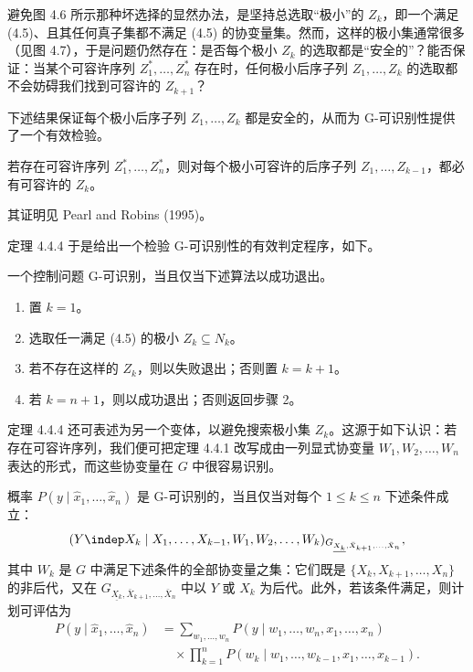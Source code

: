 避免图 4.6 所示那种坏选择的显然办法，是坚持总选取“极小”的 $Z_k$，即一个满足 \textup{(4.5)}、且其任何真子集都不满足 \textup{(4.5)} 的协变量集。然而，这样的极小集通常很多（见图 4.7），于是问题仍然存在：是否每个极小 $Z_k$ 的选取都是“安全的”？能否保证：当某个可容许序列 $Z_1^*,\dots,Z_n^*$ 存在时，任何极小后序子列 $Z_1,\dots,Z_k$ 的选取都不会妨碍我们找到可容许的 $Z_{k+1}$？

下述结果保证每个极小后序子列 $Z_1,\dots,Z_k$ 都是安全的，从而为 G-可识别性提供了一个有效检验。

\begin{theorem}
若存在可容许序列 $Z_1^*,\dots,Z_n^*$，则对每个极小可容许的后序子列 $Z_1,\dots,Z_{k-1}$，都必有可容许的 $Z_k$。
\end{theorem}

其证明见 Pearl and Robins (1995)。

定理 4.4.4 于是给出一个检验 G-可识别性的有效判定程序，如下。

\begin{corollary}
一个控制问题 G-可识别，当且仅当下述算法以成功退出。
\begin{enumerate}[label=\arabic*.,leftmargin=2.2em]
\item 置 $k=1$。
\item 选取任一满足 \textup{(4.5)} 的极小 $Z_k\subseteq N_k$。
\item 若不存在这样的 $Z_k$，则以失败退出；否则置 $k=k+1$。
\item 若 $k=n+1$，则以成功退出；否则返回步骤 2。
\end{enumerate}
\end{corollary}

定理 4.4.4 还可表述为另一个变体，以避免搜索极小集 $Z_k$。这源于如下认识：若存在可容许序列，我们便可把定理 4.4.1 改写成由一列显式协变量 $W_1,W_2,\dots,W_n$ 表达的形式，而这些协变量在 $G$ 中很容易识别。

\begin{theorem}
概率 $P(y\mid\hat{x}_1,\dots,\hat{x}_n)$ 是 G-可识别的，当且仅当对每个 $1\le k\le n$ 下述条件成立：
\[
(Y\indep X_k\mid X_1,\dots,X_{k-1},W_1,W_2,\dots,W_k)_{G_{\underline{X_k},\bar{X}_{k+1},\dots,\bar{X}_n}},
\]
其中 $W_k$ 是 $G$ 中满足下述条件的全部协变量之集：它们既是 $\{X_k,X_{k+1},\dots,X_n\}$ 的非后代，又在 $G_{\underline{X_k},\bar{X}_{k+1},\dots,\bar{X}_n}$ 中以 $Y$ 或 $X_k$ 为后代。此外，若该条件满足，则计划可评估为
\begin{equation}
\begin{aligned}
P(y\mid\hat{x}_1,\dots,\hat{x}_n) &= \sum_{w_1,\dots,w_n}P(y\mid w_1,\dots,w_n,x_1,\dots,x_n)\\
&\quad\times\prod_{k=1}^{n}P(w_k\mid w_1,\dots,w_{k-1},x_1,\dots,x_{k-1}).
\end{aligned}\tag{4.8}
\end{equation}
\end{theorem}

